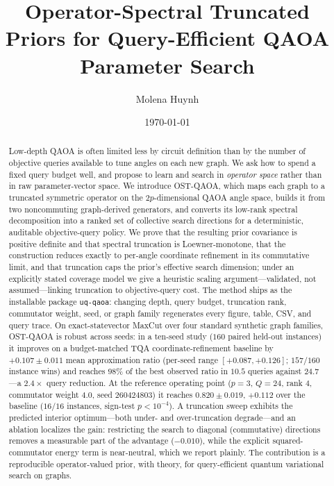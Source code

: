 \documentclass[aps,prresearch,reprint,amsmath,amssymb,floatfix,nofootinbib,superscriptaddress,longbibliography]{revtex4-2}
\theoremstyle{remark}
\newcommand{\QAOA}{\textnormal{\textsc{QAOA}}}
\newcommand{\OSTQAOA}{\textnormal{\textsc{OST-QAOA}}}
\newcommand{\TQA}{\textnormal{\textsc{TQA}}}
\begin{document}
\title{Operator-Spectral Truncated Priors for Query-Efficient QAOA Parameter Search}

\author{Molena Huynh}

\date{\today}

\begin{abstract}
Low-depth \QAOA{} is often limited less by circuit definition than by the
number of objective queries available to tune angles on each new graph.  We ask
how to spend a fixed query budget well, and propose to learn and search in
\emph{operator space} rather than in raw parameter-vector space.  We introduce
\OSTQAOA{}, which maps each graph to a truncated symmetric operator on the
\(2p\)-dimensional QAOA angle space, builds it from two noncommuting
graph-derived generators, and converts its low-rank spectral decomposition into a
ranked set of collective search directions for a deterministic, auditable
objective-query policy.  We prove that the resulting prior covariance is positive
definite and that spectral truncation is Loewner-monotone, that the construction
reduces exactly to per-angle coordinate refinement in its commutative limit, and
that truncation caps the prior's effective search dimension; under an explicitly
stated coverage model we give a heuristic scaling argument---validated, not
assumed---linking truncation to objective-query cost.  The method ships as the
installable package \texttt{uq-qaoa}: changing depth, query budget, truncation
rank, commutator weight, seed, or graph family regenerates every figure, table,
CSV, and query trace.  On exact-statevector MaxCut over four standard synthetic
graph families, \OSTQAOA{} is robust across seeds: in a ten-seed study
(\(160\) paired held-out instances) it improves on a budget-matched \TQA{}
coordinate-refinement baseline by \(+0.107\pm0.011\) mean approximation ratio
(per-seed range \([+0.087,+0.126]\); \(157/160\) instance wins) and reaches
\(98\%\) of the best observed ratio in \(10.5\) queries against \(24.7\)---a
\(2.4\times\) query reduction.  At the reference operating point
(\(p{=}3\), \(Q{=}24\), rank \(4\), commutator weight \(4.0\), seed
\(260424803\)) it reaches \(0.820\pm0.019\), \(+0.112\) over the baseline
(\(16/16\) instances, sign-test \(p<10^{-4}\)).  A truncation sweep exhibits the
predicted interior optimum---both under- and over-truncation degrade---and an
ablation localizes the gain: restricting the search to diagonal (commutative)
directions removes a measurable part of the advantage (\(-0.010\)), while the
explicit squared-commutator energy term is near-neutral, which we report
plainly.  The contribution is a reproducible operator-valued prior, with theory,
for query-efficient quantum variational search on graphs.
\end{abstract}
\end{document}
